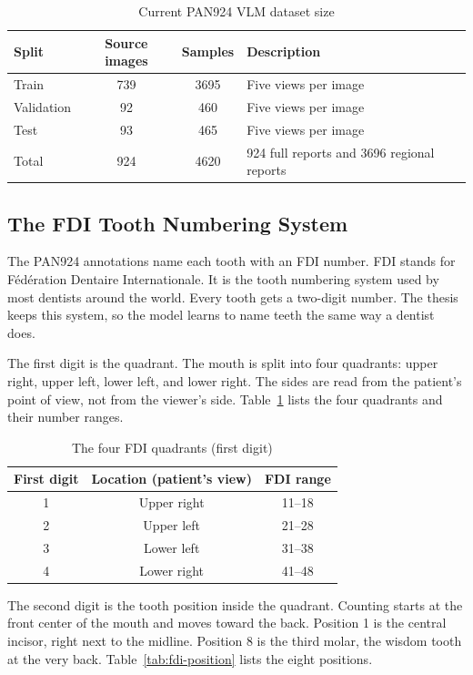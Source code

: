 \documentclass[a4paper,12pt]{report}
\begin{document}
\begin{table}[H]
\centering
\caption{Current PAN924 VLM dataset size}
\begin{tabular}{lccp{5.2cm}}
\toprule
Split & Source images & Samples & Description \\
\midrule
Train & 739 & 3695 & Five views per image \\
Validation & 92 & 460 & Five views per image \\
Test & 93 & 465 & Five views per image \\
\midrule
Total & 924 & 4620 & 924 full reports and 3696 regional reports \\
\bottomrule
\end{tabular}
\end{table}




\subsection{The FDI Tooth Numbering System}

The PAN924 annotations name each tooth with an FDI number. FDI stands for F\'ed\'eration Dentaire Internationale. It is the tooth numbering system used by most dentists around the world. Every tooth gets a two-digit number. The thesis keeps this system, so the model learns to name teeth the same way a dentist does.

The first digit is the quadrant. The mouth is split into four quadrants: upper right, upper left, lower left, and lower right. The sides are read from the patient's point of view, not from the viewer's side. Table~\ref{tab:fdi-quadrant} lists the four quadrants and their number ranges.

\begin{table}[H]
\centering
\caption{The four FDI quadrants (first digit)}
\label{tab:fdi-quadrant}
\begin{tabular}{ccc}
\toprule
First digit & Location (patient's view) & FDI range \\
\midrule
1 & Upper right & 11--18 \\
2 & Upper left  & 21--28 \\
3 & Lower left  & 31--38 \\
4 & Lower right & 41--48 \\
\bottomrule
\end{tabular}
\end{table}

The second digit is the tooth position inside the quadrant. Counting starts at the front center of the mouth and moves toward the back. Position 1 is the central incisor, right next to the midline. Position 8 is the third molar, the wisdom tooth at the very back. Table~\ref{tab:fdi-position} lists the eight positions.
\end{document}

